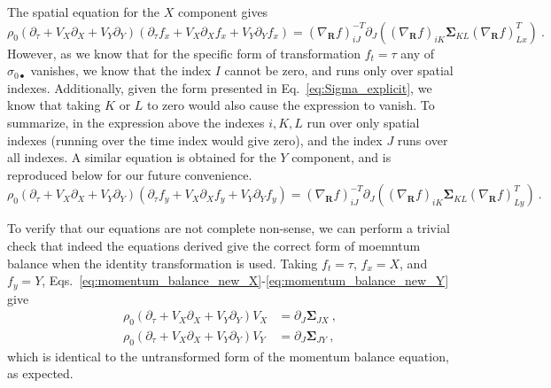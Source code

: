 \documentclass[12pt,a4paper]{article}
\begin{document}
The spatial equation for the $X$ component gives
\begin{equation}\label{eq:momentum_balance_new_X}
  \rho_0 \left(\partial_\tau + V_X\partial_X +V_Y\partial_Y \right)\left(\partial_\tau f_x + V_X \partial_X f_x + V_Y \partial_Y f_x \right) = \left(\nabla_{\bm{R}} f\right)^{-T}_{iJ}\partial_J \left(\left(\nabla_{\bm{R}} f\right)_{iK} \bm{\Sigma}_{KL} \left(\nabla_{\bm{R}} f\right)^T_{Lx}\right) \ .
\end{equation}
However, as we know that for the specific form of transformation $f_t=\tau$ any of $\sigma_{0\bullet}$ vanishes, we know that the index $I$ cannot be zero, and runs only over spatial indexes. Additionally, given the form presented in Eq.~\eqref{eq:Sigma_explicit}, we know that taking $K$ or $L$ to zero would also cause the expression to vanish. To summarize, in the expression above the indexes $i,K,L$ run over only spatial indexes (running over the time index would give zero), and the index $J$ runs over all indexes. A similar equation is obtained for the $Y$ component, and is reproduced below for our future convenience.
\begin{equation}\label{eq:momentum_balance_new_Y}
  \rho_0 \left(\partial_\tau + V_X\partial_X +V_Y\partial_Y \right)\left(\partial_\tau f_y + V_X \partial_X f_y + V_Y \partial_Y f_y \right) = \left(\nabla_{\bm{R}} f\right)^{-T}_{iJ}\partial_J \left(\left(\nabla_{\bm{R}} f\right)_{iK} \bm{\Sigma}_{KL} \left(\nabla_{\bm{R}} f\right)^T_{Ly}\right) \ .
\end{equation}

To verify that our equations are not complete non-sense, we can perform a trivial check that indeed the equations derived give the correct form of moemntum balance when the identity transformation is used. Taking $f_t = \tau$, $f_x = X$, and $f_y = Y$, Eqs.~\eqref{eq:momentum_balance_new_X}-\eqref{eq:momentum_balance_new_Y} give
\begin{equation}\label{eq:reduced_momentum}
  \begin{split}
     \rho_0 \left(\partial_\tau + V_X\partial_X +V_Y\partial_Y \right)V_X & = \partial_J \bm{\Sigma}_{JX} \ , \\
     \rho_0 \left(\partial_\tau + V_X\partial_X +V_Y\partial_Y \right)V_Y  &= \partial_J \bm{\Sigma}_{JY} \ ,
  \end{split}
\end{equation}
which is identical to the untransformed form of the momentum balance equation, as expected.
\end{document}
